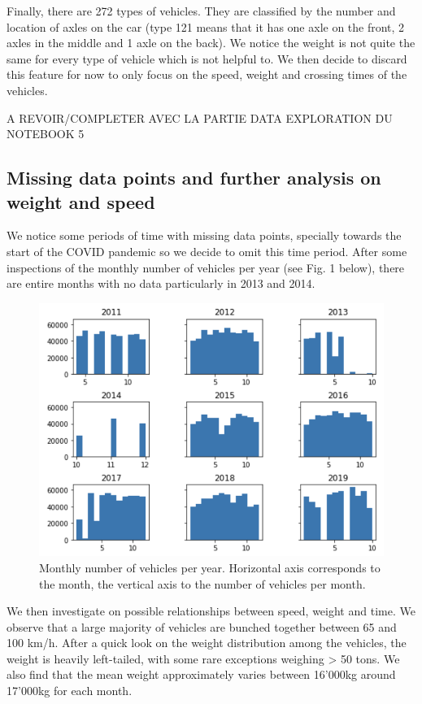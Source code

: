 \documentclass[10pt,conference,compsocconf]{IEEEtran}
\begin{document}
Finally, there are 272 types of vehicles. They are classified by the number and location of axles on the car (type 121 means that it has one axle on the front, 2 axles in the middle and 1 axle on the back). We notice the weight is not quite the same for every type of vehicle which is not helpful to. We then decide to discard this feature for now to only focus on the speed, weight and crossing times of the vehicles.

A REVOIR/COMPLETER AVEC LA PARTIE DATA EXPLORATION DU NOTEBOOK 5

\subsection{Missing data points and further analysis on weight and speed}

We notice some periods of time with missing data points, specially towards the start of the COVID pandemic so we decide to omit this time period. After some inspections of the monthly number of vehicles per year (see Fig. 1 below), there are entire months with no data particularly in 2013 and 2014. \par

\begin{figure}[h]
  \includegraphics[scale = 0.63]{report/img/monthly-number-vehicles-per-year.png}
  \caption{Monthly number of vehicles per year. Horizontal axis corresponds to the month, the vertical axis to the number of vehicles per month.}
  \label{monthly-number-of-vehicles-per-year}
\end{figure}

We then investigate on possible relationships between speed, weight and time. We observe that a large majority of vehicles are bunched together between 65 and 100 km/h. After a quick look on the weight distribution among the vehicles, the weight is heavily left-tailed, with some rare exceptions weighing > 50 tons. We also find that the mean weight approximately varies between 16'000kg around 17'000kg for each month. 
\end{document}
